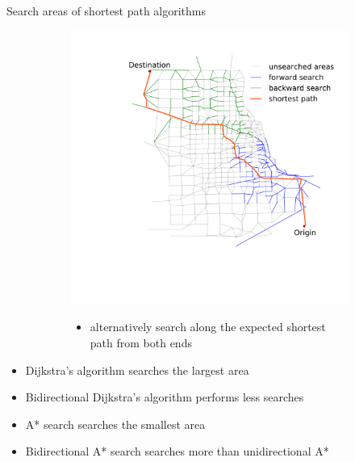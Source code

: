 \documentclass[final]{beamer}
\begin{document}
\begin{frame}{ }
\begin{columns}[t]
\begin{column}{.4\linewidth}
\begin{block}{Search areas of shortest path algorithms \vspace{-.2em}}
\begin{figure}
\begin{subfigure}{.5\linewidth}
                    \includegraphics[width=\linewidth,trim=120px 280px 48px 60px,clip]{img/astar_bidirect}
                    \begin{itemize}
                            \centering
                        \item alternatively search along the expected shortest path from both ends
                    \end{itemize}
                \end{subfigure}
            \end{figure}
            \begin{itemize}
                \itemsep.4em
                \item Dijkstra's algorithm searches the largest area
                \item Bidirectional Dijkstra's algorithm performs less searches 
                \item \alert{A* search searches the smallest area}
                \item Bidirectional A* search searches more than unidirectional A*
            \end{itemize}
        \end{block}


\end{column}
\end{columns}
\end{frame}
\end{document}
